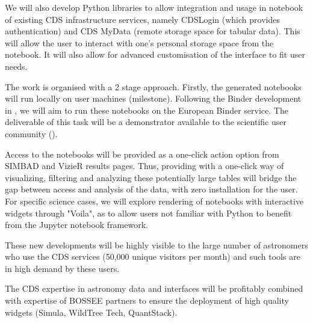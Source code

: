 \begin{task}[
  title=Astronomy application,
  id=astro,
  lead=CDS,
  PM=18,
  wphases={0-48},
  partners={CDS,QS,WTT,SRL}
]
  We will also develop Python libraries to allow integration and usage in
  notebook of existing CDS infrastructure services, namely CDSLogin (which
  provides authentication) and CDS MyData (remote storage space for tabular
  data).
  This will allow the user to interact with one's personal storage space from
  the notebook. It will also allow for advanced customisation of the interface 
  to fit user needs.

  The work is organised with a 2 stage approach. Firstly, the generated 
  notebooks will run locally on user machines (milestone). Following the 
  Binder development in , we will aim to run these notebooks 
  on the European Binder service. The deliverable of this task will be a 
  demonstrator available to the scientific user community 
  ().


  Access to the notebooks will be provided as a one-click action option from
  SIMBAD and VizieR results pages.
  Thus, providing with a one-click way of visualizing, filtering and analyzing
these potentially large tables will bridge the gap between access and analysis
of the data, with zero installation for the user.
  For specific science cases, we will explore rendering of notebooks with 
  interactive widgets through "Voila", as to allow users not familiar with 
  Python to benefit from the Jupyter notebook framework.

  These new developments will be highly visible to the large number of astronomers who use the CDS services (50,000 unique visitors per month) and such tools are in high demand by these users.

  The CDS expertise in astronomy data and interfaces will be profitably combined with expertise of BOSSEE partners to ensure the deployment of high quality widgets (Simula, WildTree Tech, QuantStack).


\end{task}
